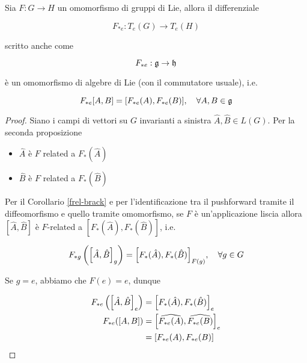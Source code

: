 \begin{definition}
	Sia $ F : G \to H $ un omomorfismo di gruppi di Lie, allora il differenziale
	
	\begin{equation}
		F_{*e} : T_{e}(G) \to T_{e}(H)
	\end{equation}

	scritto anche come
	
	\begin{equation}
		F_{*e} : \mathfrak{g} \to \mathfrak{h}
	\end{equation}

	è un omomorfismo di algebre di Lie (con il commutatore usuale), i.e.
	
	\begin{equation}
		F_{*e} \comm{A}{B} = \comm{F_{*e} (A)}{F_{*e} (B)} \qcomma \forall A,B \in \g
	\end{equation}
\end{definition}

\begin{proof}
	Siano i campi di vettori su $ G $ invarianti a sinistra $ \hat{A},\hat{B} \in L(G) $. Per la seconda proposizione
	
	\begin{itemize}
		\item $ \hat{A} $ è $ F $ related a $ F_{*}(\hat{A}) $
		
		\item $ \hat{B} $ è $ F $ related a $ F_{*}(\hat{B}) $
	\end{itemize}

	Per il Corollario \ref{frel-brack} e per l'identificazione tra il pushforward tramite il diffeomorfismo e quello tramite omomorfismo, se $ F $ è un'applicazione liscia allora $ [\hat{A},\hat{B}] $ è $ F $-related a $ [F_{*} (\hat{A}),F_{*} (\hat{B})] $, i.e.
	
	\begin{equation}
		F_{*g} \left( \comm{\hat{A}}{\hat{B}}_{g} \right) = \comm{ F_{*}(\hat{A}) }{ F_{*}(\hat{B}) }_{F(g)} %
		\qcomma \forall g \in G
	\end{equation}

	Se $ g = e $, abbiamo che $ F(e) = e $, dunque
	
	\begin{align}
		\begin{split}
			F_{*e} \left( \comm{\hat{A}}{\hat{B}}_{e} \right) &= \comm{ F_{*}(\hat{A}) }{ F_{*}(\hat{B}) }_{e} \\
			F_{*e} (\comm{A}{B}) &= \comm{ \widehat{ F_{*e}(A) } }{ \widehat{ F_{*e}(B) } }_{e} \\
			&= \comm{F_{*e} (A)}{F_{*e} (B)}
		\end{split}
	\end{align}
\end{proof}

